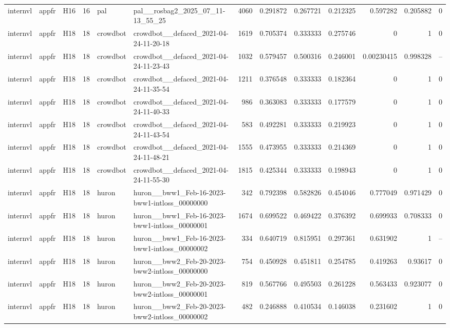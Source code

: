 \begin{longtable}{lllrllrrrrrrr}
internvl & appfr & H16 & 16 & pal & pal\_\_rosbag2\_2025\_07\_11-13\_55\_25 & 4060 & 0.291872 & 0.267721 & 0.212325 & 0.597282 & 0.205882 & 0 \\
internvl & appfr & H18 & 18 & crowdbot & crowdbot\_\_defaced\_2021-04-24-11-20-18 & 1619 & 0.705374 & 0.333333 & 0.275746 & 0 & 1 & 0 \\
internvl & appfr & H18 & 18 & crowdbot & crowdbot\_\_defaced\_2021-04-24-11-23-43 & 1032 & 0.579457 & 0.500316 & 0.246001 & 0.00230415 & 0.998328 & -- \\
internvl & appfr & H18 & 18 & crowdbot & crowdbot\_\_defaced\_2021-04-24-11-35-54 & 1211 & 0.376548 & 0.333333 & 0.182364 & 0 & 1 & 0 \\
internvl & appfr & H18 & 18 & crowdbot & crowdbot\_\_defaced\_2021-04-24-11-40-33 & 986 & 0.363083 & 0.333333 & 0.177579 & 0 & 1 & 0 \\
internvl & appfr & H18 & 18 & crowdbot & crowdbot\_\_defaced\_2021-04-24-11-43-54 & 583 & 0.492281 & 0.333333 & 0.219923 & 0 & 1 & 0 \\
internvl & appfr & H18 & 18 & crowdbot & crowdbot\_\_defaced\_2021-04-24-11-48-21 & 1555 & 0.473955 & 0.333333 & 0.214369 & 0 & 1 & 0 \\
internvl & appfr & H18 & 18 & crowdbot & crowdbot\_\_defaced\_2021-04-24-11-55-30 & 1815 & 0.425344 & 0.333333 & 0.198943 & 0 & 1 & 0 \\
internvl & appfr & H18 & 18 & huron & huron\_\_bww1\_Feb-16-2023-bww1-intloss\_00000000 & 342 & 0.792398 & 0.582826 & 0.454046 & 0.777049 & 0.971429 & 0 \\
internvl & appfr & H18 & 18 & huron & huron\_\_bww1\_Feb-16-2023-bww1-intloss\_00000001 & 1674 & 0.699522 & 0.469422 & 0.376392 & 0.699933 & 0.708333 & 0 \\
internvl & appfr & H18 & 18 & huron & huron\_\_bww1\_Feb-16-2023-bww1-intloss\_00000002 & 334 & 0.640719 & 0.815951 & 0.297361 & 0.631902 & 1 & -- \\
internvl & appfr & H18 & 18 & huron & huron\_\_bww2\_Feb-20-2023-bww2-intloss\_00000000 & 754 & 0.450928 & 0.451811 & 0.254785 & 0.419263 & 0.93617 & 0 \\
internvl & appfr & H18 & 18 & huron & huron\_\_bww2\_Feb-20-2023-bww2-intloss\_00000001 & 819 & 0.567766 & 0.495503 & 0.261228 & 0.563433 & 0.923077 & 0 \\
internvl & appfr & H18 & 18 & huron & huron\_\_bww2\_Feb-20-2023-bww2-intloss\_00000002 & 482 & 0.246888 & 0.410534 & 0.146038 & 0.231602 & 1 & 0 \\

\end{longtable}
